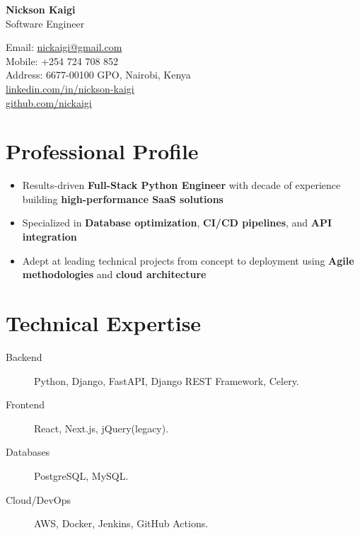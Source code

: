 \documentclass[11pt]{article} %
\begin{document}
\begin{center}
    \begin{minipage}{0.5\textwidth}
    {\Huge\bfseries
        \texorpdfstring{Nickson Kaigi}{Nickson Kaigi}
        } \\ \medskip
        Software Engineer
    \end{minipage} \hfill
    \begin{minipage}{0.4\textwidth}
        \raggedleft
        Email: \href{mailto:nickaigi@gmail.com}{nickaigi@gmail.com} \\
        Mobile: +254 724 708 852 \\
        Address: 6677-00100 GPO, Nairobi, Kenya \\
        \href{https://www.linkedin.com/in/nickson-kaigi/}{linkedin.com/in/nickson-kaigi} \\
        \href{https://github.com/nickaigi}{github.com/nickaigi}
    \end{minipage}
\end{center}

\section{Professional Profile}
\begin{itemize}
    \item Results-driven \textbf{Full-Stack Python Engineer} with decade of experience building \textbf{high-performance SaaS solutions}
    \item Specialized in \textbf{Database optimization}, \textbf{CI/CD pipelines}, and \textbf{API integration}
    \item Adept at leading technical projects from concept to deployment using \textbf{Agile methodologies} and \textbf{cloud architecture}
\end{itemize}

\section{Technical Expertise}
\begin{description}
    \item[Backend] Python, Django, FastAPI, Django REST Framework, Celery.
    \item[Frontend] React, Next.js, jQuery(legacy).
    \item[Databases] PostgreSQL, MySQL.
    \item[Cloud/DevOps] AWS, Docker, Jenkins, GitHub Actions.
\end{description}
\end{document}
